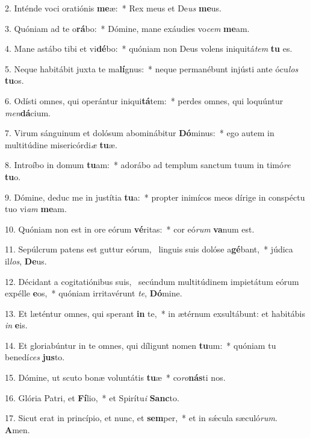2. Inténde voci oratiónis \textbf{me}æ:~*  Rex meus et De\textit{us} \textbf{me}us.\

3. Quóniam ad te o\textbf{rá}bo:~*  Dómine, mane exáudies vo\textit{cem} \textbf{me}am.\

4. Mane astábo tibi et vi\textbf{dé}bo:~*  quóniam non Deus volens iniquitá\textit{tem} \textbf{tu} es.\

5. Neque habitábit juxta te ma\textbf{lí}gnus:~*  neque permanébunt injústi ante ócu\textit{los} \textbf{tu}os.\

6. Odísti omnes, qui operántur iniqui\textbf{tá}tem:~*  perdes omnes, qui loquúntur \textit{men}\textbf{dá}cium.\

7. Virum sánguinum et dolósum abominábitur \textbf{Dó}minus:~*  ego autem in multitúdine misericórdi\textit{æ} \textbf{tu}æ.\

8. Introíbo in domum \textbf{tu}am:~*  adorábo ad templum sanctum tuum in timó\textit{re} \textbf{tu}o.\

9. Dómine, deduc me in justítia \textbf{tu}a:~*  propter inimícos meos dírige in conspéctu tuo vi\textit{am} \textbf{me}am.\

10. Quóniam non est in ore eórum \textbf{vé}ritas:~*  cor eó\textit{rum} \textbf{va}num est.\

11. Sepúlcrum patens est guttur eórum, \dag\  linguis suis dolóse a\textbf{gé}bant,~*  júdica il\textit{los}, \textbf{De}us.\

12. Décidant a cogitatiónibus suis, \dag\  secúndum multitúdinem impietátum eórum expélle \textbf{e}os,~*  quóniam irritavérunt \textit{te}, \textbf{Dó}mine.\

13. Et læténtur omnes, qui sperant \textbf{in} te,~*  in ætérnum exsultábunt: et habitábis \textit{in} \textbf{e}is.\

14. Et gloriabúntur in te omnes, qui díligunt nomen \textbf{tu}um:~*  quóniam tu benedí\textit{ces} \textbf{jus}to.\

15. Dómine, ut scuto bonæ voluntátis \textbf{tu}æ~*  co\textit{ro}\textbf{nás}ti nos.\

16. Glória Patri, et \textbf{Fí}lio,~*  et Spirítu\textit{i} \textbf{Sanc}to.\

17. Sicut erat in princípio, et nunc, et \textbf{sem}per,~*  et in sǽcula sæculó\textit{rum}. \textbf{A}men.\

